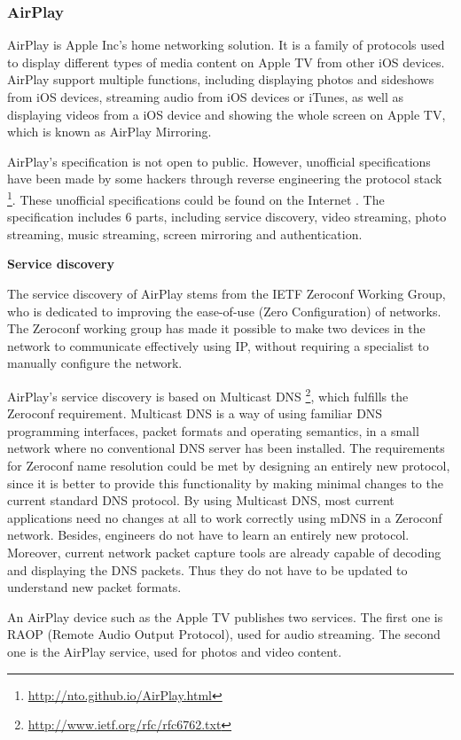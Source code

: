\subsubsection{AirPlay\label{2_2_3}} 
AirPlay is Apple Inc's home networking solution. It is a family of protocols 
used to display different types of media content on Apple TV from other iOS devices. 
AirPlay support multiple functions, including displaying photos and sideshows
from iOS devices, streaming audio from iOS devices or iTunes, as well as
displaying videos from a iOS device and showing the whole screen on Apple TV,
which is known as AirPlay Mirroring.

AirPlay's specification is not open to public. However, unofficial
specifications have been made by some hackers through reverse engineering the
protocol stack \footnote{\url{http://nto.github.io/AirPlay.html}}. These
unofficial specifications could be found on the Internet \cite{AirPlay-spec}.
The specification includes 6 parts, including service discovery, video
streaming, photo streaming, music streaming, screen mirroring and
authentication.

\textbf{Service discovery}

The service discovery of AirPlay stems from the IETF Zeroconf Working Group, 
who is dedicated to improving the ease-of-use (Zero Configuration) of networks. The 
Zeroconf working group has made it possible to make two devices in the 
network to communicate effectively using IP, without requiring a specialist to manually 
configure the network.

AirPlay's service discovery is based on Multicast DNS \cite{multicastdns}
\footnote{\url{http://www.ietf.org/rfc/rfc6762.txt}}, which fulfills the
Zeroconf requirement. Multicast DNS is a way of using familiar DNS programming interfaces, packet formats and operating semantics, in a small 
network where no conventional DNS server has been installed. The requirements 
for Zeroconf name resolution could be met by designing an entirely new 
protocol, since it is better to provide this functionality by making minimal changes 
to the current standard DNS protocol. By using Multicast DNS, most current 
applications need no changes at all to work correctly using mDNS in a Zeroconf network. Besides,
engineers do not have to learn an entirely new protocol. Moreover, current network 
packet capture tools are already capable of  decoding and displaying the DNS packets. Thus they do not 
have to be updated to understand new packet formats.

An AirPlay device such as the Apple TV publishes two services. The first one is 
RAOP (Remote Audio Output Protocol), used for audio streaming. The second 
one is the AirPlay service, used for photos and video content.

